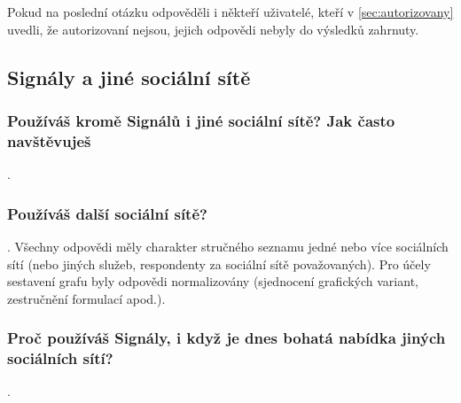 

Pokud na poslední otázku odpověděli i někteří uživatelé,
kteří v \ref{sec:autorizovany} uvedli, že autorizovaní nejsou,
jejich odpovědi nebyly do výsledků zahrnuty.

\subsection{Signály a jiné sociální sítě}\label{sec:jinesite}

\subsubsection{Používáš kromě Signálů i jiné sociální sítě? Jak často navštěvuješ}

\qtype \pickOne. \series







\pagebreak

\subsubsection{Používáš další sociální sítě?}

\qtype \freeEntry.
Všechny odpovědi měly charakter stručného seznamu jedné nebo více
sociálních sítí (nebo jiných služeb, respondenty za sociální sítě
považovaných). Pro účely sestavení grafu byly odpovědi normalizovány
(sjednocení grafických variant, zestručnění formulací apod.).


\subsubsection{Proč používáš Signály, i když je dnes bohatá nabídka jiných sociálních sítí?}\label{sec:konkurence}

\qtype \pickOne. \series

